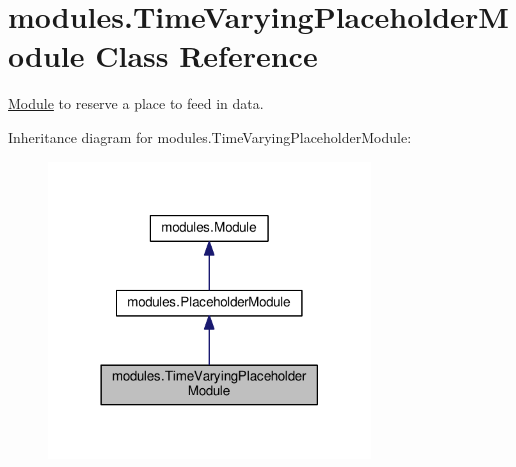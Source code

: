 \hypertarget{classmodules_1_1_time_varying_placeholder_module}{}\section{modules.\+Time\+Varying\+Placeholder\+Module Class Reference}
\label{classmodules_1_1_time_varying_placeholder_module}


\hyperlink{classmodules_1_1_module}{Module} to reserve a place to feed in data.  




Inheritance diagram for modules.\+Time\+Varying\+Placeholder\+Module\+:\nopagebreak
\begin{figure}[H]
\begin{center}
\leavevmode
\includegraphics[width=242pt]{classmodules_1_1_time_varying_placeholder_module__inherit__graph}
\end{center}
\end{figure}
